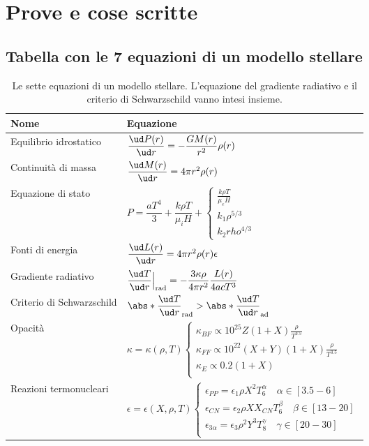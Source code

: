 \section{Prove e cose scritte}
\subsection{Tabella con le 7 equazioni di un modello stellare}
\begin{table}
\caption{Le sette equazioni di un modello stellare. L'equazione del gradiente radiativo e il criterio di Schwarzschild vanno intesi insieme.}
\label{tab:modello-stellare}
\centering
\begin{tabular}{ll}
\toprule
Nome & Equazione \\
\midrule
Equilibrio idrostatico & $\dfrac{\ud P(r)}{\ud r} = -\dfrac{G M(r)}{r^2} \rho(r)$ \\[2ex]
Continuità di massa & $\dfrac{\ud M(r)}{\ud r} = 4 \pi r^2 \rho(r)$    \\[2ex]
Equazione di stato & $P = \dfrac{aT^4}{3} + \dfrac{k \rho T}{\mu_i H} + \begin{cases} \frac{k \rho T}{\mu_e H} \\ k_1 \rho^{5/3} \\ k_2 rho^{4/3} \end{cases}$   \\[2ex]
Fonti di energia & $\dfrac{\ud L(r)}{\ud r} = 4 \pi r^2 \rho(r) \epsilon$    \\[2ex]
Gradiente radiativo & $\dfrac{\ud T}{\ud r}\Big|_\textup{rad} = - \dfrac{3 \kappa \rho}{4 \pi r^2} \dfrac{L(r)}{4 a c T^3}$   \\[2ex]
Criterio di Schwarzschild & $\abs*{\dfrac{\ud T}{\ud r}}_\textup{rad} > \abs*{\dfrac{\ud T}{\ud r}}_\textup{ad}$   \\[2ex]
Opacità & $\kappa = \kappa(\rho, T) \begin{cases} \kappa_{BF} \propto 10^{25} Z(1 + X) \frac{\rho}{T^{3.5}} \\ \kappa_{FF} \propto 10^{22} (X+Y)(1+X) \frac{\rho}{T^{3.5}} \\ \kappa_{E} \propto 0.2 (1+X) \\ \end{cases}$    \\[2ex]
Reazioni termonucleari & $\epsilon = \epsilon(X, \rho, T) \begin{cases} \epsilon_{PP} = \epsilon_1 \rho X^2 T_6^\alpha \quad \alpha \in [3.5 - 6] \\ \epsilon_{CN} = \epsilon_2 \rho X X_{CN} T_6^\beta \quad \beta \in [13 - 20] \\ \epsilon_{3\alpha} = \epsilon_3 \rho^2 Y^3 T_8^\gamma \quad \gamma \in [20 - 30] \\\end{cases}$   \\[2ex]
\bottomrule
\end{tabular}
\end{table}